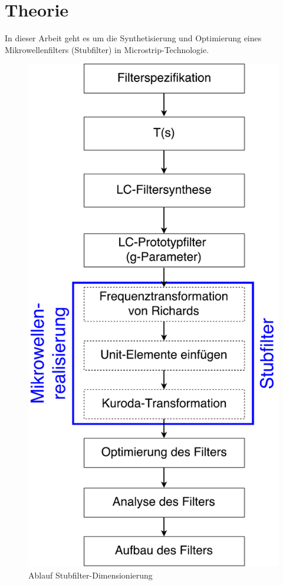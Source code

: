 \section{Theorie}


In  dieser  Arbeit  geht  es  um die  Synthetisierung  und  Optimierung  eines
Mikrowellenfilters (Stubfilter) in Microstrip-Technologie.

\begin{figure}[h!]
\centering
 	\includegraphics[width=\imagewidth]{images/Ablauf_Filterdimensionierung.pdf}
 	\caption{Ablauf Stubfilter-Dimensionierung}
 	\label{fig:Ablauf_Filterdimensionierung}
\end{figure}


